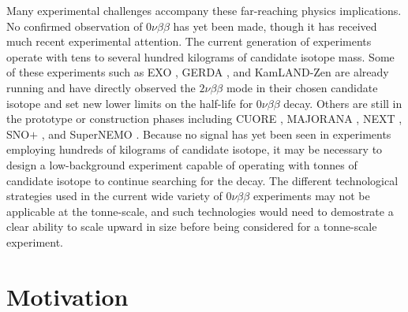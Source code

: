 \documentclass{JINST}
\begin{document}
Many experimental challenges accompany these far-reaching physics implications.  No confirmed observation of
$0\nu\beta\beta$ has yet been made, though it has received much recent experimental attention.   The current 
generation of experiments operate with tens to several hundred kilograms of candidate isotope mass.  Some of these
experiments such as EXO \cite{EXO_2012, EXOPRL_2012}, GERDA \cite{GERDA_2004, GERDA_2013}, and KamLAND-Zen 
\cite{KamLANDZen_2012, KamLANDZen_2013} are already running and have directly observed the $2\nu\beta\beta$ 
mode in their chosen candidate isotope and set new lower limits on the half-life for $0\nu\beta\beta$ decay.  Others are 
still in the prototype or construction phases including CUORE \cite{CUORE_2015}, MAJORANA \cite{MAJORANA_2013}, 
NEXT \cite{NEXT_2014}, SNO$+$ \cite{SNOPLUS_2014}, and SuperNEMO \cite{SuperNEMO_2010}.  Because no signal
has yet been seen in experiments employing hundreds of kilograms of candidate isotope, it may be necessary to 
design a low-background experiment capable of operating with tonnes of candidate isotope to continue searching
for the decay.  The different technological strategies used in the current wide variety of $0\nu\beta\beta$
experiments may not be applicable at the tonne-scale, and such technologies would need to demostrate a clear
ability to scale upward in size before being considered for a tonne-scale experiment.


\section{Motivation}
\end{document}
